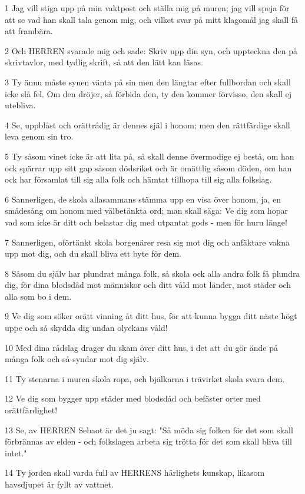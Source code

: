 \par 1 Jag vill stiga upp på min vaktpost och ställa mig på muren; jag vill speja för att se vad han skall tala genom mig, och vilket svar på mitt klagomål jag skall få att frambära.
\par 2 Och HERREN svarade mig och sade: Skriv upp din syn, och uppteckna den på skrivtavlor, med tydlig skrift, så att den lätt kan läsas.
\par 3 Ty ännu måste synen vänta på sin men den längtar efter fullbordan och skall icke slå fel. Om den dröjer, så förbida den, ty den kommer förvisso, den skall ej utebliva.
\par 4 Se, uppblåst och orättrådig är dennes själ i honom; men den rättfärdige skall leva genom sin tro.
\par 5 Ty såsom vinet icke är att lita på, så skall denne övermodige ej bestå, om han ock spärrar upp sitt gap såsom dödsriket och är omättlig såsom döden, om han ock har församlat till sig alla folk och hämtat tillhopa till sig alla folkslag.
\par 6 Sannerligen, de skola allasammans stämma upp en visa över honom, ja, en smädesång om honom med välbetänkta ord; man skall säga: Ve dig som hopar vad som icke är ditt och belastar dig med utpantat gods - men för huru länge!
\par 7 Sannerligen, oförtänkt skola borgenärer resa sig mot dig och anfäktare vakna upp mot dig, och du skall bliva ett byte för dem.
\par 8 Såsom du själv har plundrat många folk, så skola ock alla andra folk få plundra dig, för dina blodsdåd mot människor och ditt våld mot länder, mot städer och alla som bo i dem.
\par 9 Ve dig som söker orätt vinning åt ditt hus, för att kunna bygga ditt näste högt uppe och så skydda dig undan olyckans våld!
\par 10 Med dina rådslag drager du skam över ditt hus, i det att du gör ände på många folk och så syndar mot dig själv.
\par 11 Ty stenarna i muren skola ropa, och bjälkarna i trävirket skola svara dem.
\par 12 Ve dig som bygger upp städer med blodsdåd och befäster orter med orättfärdighet!
\par 13 Se, av HERREN Sebaot är det ju sagt: "Så möda sig folken för det som skall förbrännas av elden - och folkslagen arbeta sig trötta för det som skall bliva till intet."
\par 14 Ty jorden skall varda full av HERRENS härlighets kunskap, likasom havsdjupet är fyllt av vattnet.
